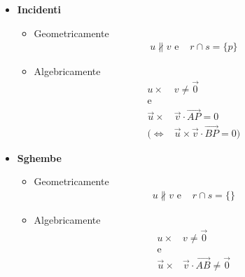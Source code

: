 \documentclass[../main.tex]{subfiles}
\begin{document}
\begin{itemize}
\begin{itemize}
    \end{itemize}
    \item \textbf{Incidenti}
    \begin{itemize}
        \item Geometricamente \begin{align*}
            u \nparallel v \text{ e }& r\cap s = \{ p\} 
        \end{align*} 
        \item Algebricamente \begin{align*}
            u \times& v \neq \vec{0} \\
            \text{e} \\
            \vec{u} \times& \vec{v} \cdot \vec{AP}  =  0 \\
            (\Leftrightarrow&  \vec{u} \times \vec{v} \cdot \vec{BP} = 0)
        \end{align*}
    \end{itemize}
    \item \textbf{Sghembe}
    \begin{itemize}
        \item Geometricamente \begin{align*}
            u \nparallel v \text{ e }& r\cap s = \{ \} 
        \end{align*} 
        \item Algebricamente \begin{align*}
            u \times& v \neq \vec{0} \\
            \text{e} \\
            \vec{u} \times& \vec{v} \cdot \vec{AB} \neq \vec{0}
        \end{align*}
    \end{itemize}
\end{itemize}
\end{document}
